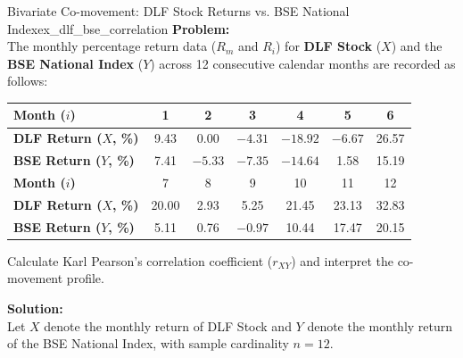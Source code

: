 \begin{example}{Bivariate Co-movement: DLF Stock Returns vs. BSE National Index}{ex_dlf_bse_correlation}
\textbf{Problem:} \\
The monthly percentage return data ($R_m$ and $R_i$) for \textbf{DLF Stock} ($X$) and the \textbf{BSE National Index} ($Y$) across 12 consecutive calendar months are recorded as follows:
\begin{center}
\small
\renewcommand{\arraystretch}{1.15}
\begin{tabular}{lcccccc}
\toprule
\textbf{Month ($i$)} & 1 & 2 & 3 & 4 & 5 & 6 \\
\midrule
\textbf{DLF Return ($X$, \%)} & 9.43 & 0.00 & $-4.31$ & $-18.92$ & $-6.67$ & 26.57 \\
\textbf{BSE Return ($Y$, \%)} & 7.41 & $-5.33$ & $-7.35$ & $-14.64$ & 1.58 & 15.19 \\
\midrule
\textbf{Month ($i$)} & 7 & 8 & 9 & 10 & 11 & 12 \\
\midrule
\textbf{DLF Return ($X$, \%)} & 20.00 & 2.93 & 5.25 & 21.45 & 23.13 & 32.83 \\
\textbf{BSE Return ($Y$, \%)} & 5.11 & 0.76 & $-0.97$ & 10.44 & 17.47 & 20.15 \\
\bottomrule
\end{tabular}
\end{center}
Calculate Karl Pearson's correlation coefficient ($r_{XY}$) and interpret the co-movement profile.

\tcbline
\textbf{Solution:} \\
Let $X$ denote the monthly return of DLF Stock and $Y$ denote the monthly return of the BSE National Index, with sample cardinality $n = 12$.


\end{example}
